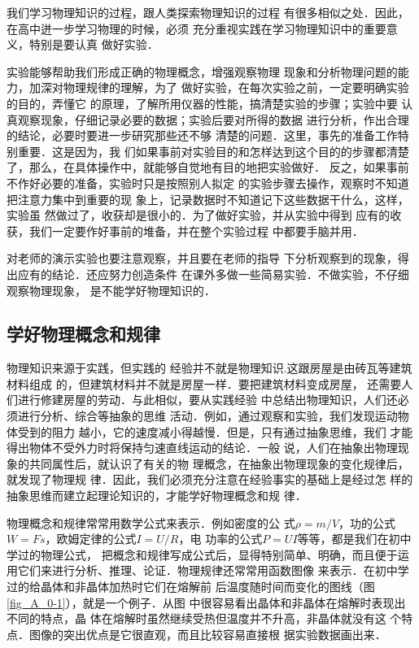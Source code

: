     我们学习物理知识的过程，跟人类探索物理知识的过程
有很多相似之处．因此，在高中迸一步学习物理的时候，必须
充分重视实践在学习物理知识中的重要意义，特别是要认真
做好实验．

    实验能够帮助我们形成正确的物理概念，增强观察物理
现象和分析物理问题的能力，加深对物理规律的理解，为了
做好实验，在每次实验之前，一定要明确实验的目的，弄懂它
的原理，了解所用仪器的性能，搞清楚实验的步骤；实验中要
认真观察现象，仔细记录必要的数据；实验后要对所得的数据
进行分析，作出合理的结论，必要时要进一步研究那些还不够
清楚的问题．这里，事先的准备工作特别重要．这是因为，我
们如果事前对实验目的和怎样达到这个目的的步骤都清楚
了，那么，在具体操作中，就能够自觉地有目的地把实验做好．
反之，如果事前不作好必要的准备，实验时只是按照别人拟定
的实验步骤去操作，观察时不知道把注意力集中到重要的现
象上，记录数据时不知道记下这些数据干什么，这样，实验虽
然做过了，收获却是很小的．为了做好实验，并从实验中得到
应有的收获，我们一定要作好事前的堆备，并在整个实验过程
中都要手脑并用．

    对老师的演示实验也要注意观察，并且要在老师的指导
下分析观察到的现象，得出应有的结论．还应努力创造条件
在课外多做一些简易实验．不做实验，不仔细观察物理现象，
是不能学好物理知识的．

\subsection*{学好物理概念和规律}

物理知识来源于实践，但实践的
经验并不就是物理知识.这跟房屋是由砖瓦等建筑材料组成
的，但建筑材料并不就是房屋一样．要把建筑材料变成房屋，
还需要人们进行修建房屋的劳动．与此相似，要从实践经验
中总结出物理知识，人们还必须进行分析、综合等抽象的思维
活动．例如，通过观察和实验，我们发现运动物体受到的阻力
越小，它的速度减小得越慢．但是，只有通过抽象思维，我们
才能得出物体不受外力时将保持匀速直线运动的结论．一般
说，人们在抽象出物理现象的共同属性后，就认识了有关的物
理概念，在抽象出物理现象的变化规律后，就发现了物理规
律．因此，我们必须充分注意在经验事实的基础上是经过怎
样的抽象思维而建立起理论知识的，才能学好物理概念和规
律．

物理概念和规律常常用数学公式来表示．例如密度的公
式$\rho=m/V$，功的公式$W=Fs$，欧姆定律的公式$I=U/R$，电
功率的公式$P=UI$等等，都是我们在初中学过的物理公式，
把概念和规律写成公式后，显得特别简单、明确，而且便于运
用它们来进行分析、推理、论证．物理规律还常常用函数图像
来表示．在初中学过的给晶体和非晶体加热时它们在熔解前
后温度随时间而变化的图线（图 \ref{fig_A_0-1}），就是一个例子．从图
中很容易看出晶体和非晶体在熔解时表现出不同的特点，晶
体在熔解时虽然继续受热但温度并不升高，非晶体就没有这
个特点．图像的突出优点是它很直观，而且比较容易直接根
据实验数据画出来．

